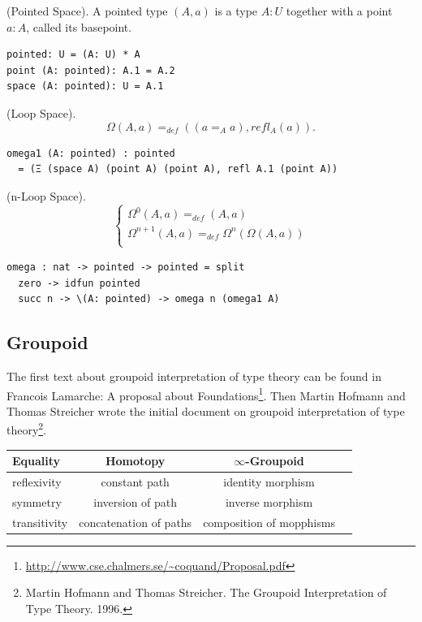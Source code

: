 \documentclass{article}
\begin{document}
\begin{definition} (Pointed Space). A pointed type $(A,a)$ is a type $A:U$
together with a point $a:A$, called its basepoint.
\begin{lstlisting}
pointed: U = (A: U) * A
point (A: pointed): A.1 = A.2
space (A: pointed): U = A.1
\end{lstlisting}
\end{definition}

\begin{definition} (Loop Space).
$$\Omega(A,a) =_{def} ((a =_A a), refl_A(a)).$$
\begin{lstlisting}
omega1 (A: pointed) : pointed
  = (Ξ (space A) (point A) (point A), refl A.1 (point A))
\end{lstlisting}
\end{definition}

\begin{definition} (n-Loop Space).
$$
\begin{cases}
\Omega^0(A, a) =_{def} (A, a)\\
\Omega^{n+1}(A,a) =_{def} \Omega^{n}(\Omega(A,a))\\
\end{cases}
$$
\begin{lstlisting}
omega : nat -> pointed -> pointed = split
  zero -> idfun pointed
  succ n -> \(A: pointed) -> omega n (omega1 A)
\end{lstlisting}
\end{definition}

\newpage
\subsection{Groupoid}
The first text about groupoid interpretation of type theory can be found in Francois Lamarche:
A proposal about Foundations\footnote{\url{http://www.cse.chalmers.se/~coquand/Proposal.pdf}}.
Then Martin Hofmann and Thomas Streicher wrote the initial
document on groupoid interpretation of type
theory\footnote{Martin Hofmann and Thomas Streicher. The Groupoid Interpretation of Type Theory. 1996.}.

\begin{table}[H]
\begin{center}
\begin{tabular}{lccc}
\hline
{\bf Equality} & {\bf Homotopy} & {\bf $\infty$-Groupoid} \\
\hline
reflexivity  & constant path & identity morphism \\
symmetry     & inversion of path & inverse morphism \\
transitivity & concatenation of paths & composition of mopphisms \\
\hline
\end{tabular}
\end{center}
\end{table}
\end{document}
